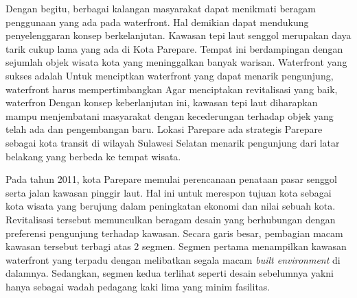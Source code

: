 \documentclass[../projects/thesis.tex]{subfiles}
\begin{document}


Dengan begitu, berbagai kalangan masyarakat dapat menikmati beragam penggunaan yang ada pada waterfront.
Hal demikian dapat mendukung penyelenggaran konsep berkelanjutan.
Kawasan tepi laut senggol merupakan daya tarik cukup lama yang ada di Kota Parepare.
Tempat ini berdampingan dengan sejumlah objek wisata kota yang meninggalkan banyak warisan. Waterfront yang sukses adalah
Untuk menciptkan waterfront yang dapat menarik pengunjung, waterfront harus mempertimbangkan
Agar menciptakan revitalisasi yang baik, waterfron
Dengan konsep keberlanjutan ini, kawasan tepi laut diharapkan mampu menjembatani masyarakat dengan kecederungan terhadap objek yang telah ada dan pengembangan baru.
Lokasi Parepare ada
strategis
Parepare sebagai kota transit di wilayah Sulawesi Selatan menarik pengunjung dari latar belakang yang berbeda ke tempat wisata.

%
%
%



%
%
%

Pada tahun 2011, kota Parepare memulai perencanaan penataan pasar senggol serta jalan kawasan pinggir laut. Hal ini untuk merespon tujuan kota sebagai kota wisata yang berujung dalam peningkatan ekonomi dan nilai sebuah kota. Revitalisasi tersebut memunculkan beragam desain yang berhubungan dengan  preferensi pengunjung terhadap kawasan. Secara garis besar, pembagian macam kawasan tersebut terbagi atas 2 segmen. Segmen pertama menampilkan kawasan waterfront yang terpadu dengan melibatkan segala macam \textit{built environment} di dalamnya. Sedangkan, segmen kedua terlihat seperti desain sebelumnya yakni hanya sebagai wadah pedagang kaki lima yang minim fasilitas.
\end{document}
